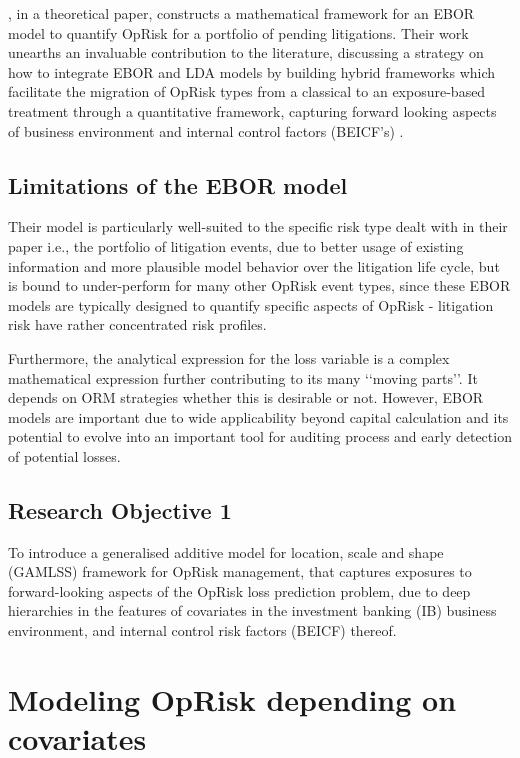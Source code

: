 \documentclass[a4paper]{article}
\begin{document}
\cite{einemann2018operational}, in a theoretical paper, constructs a mathematical framework for an EBOR model to quantify OpRisk for a portfolio of pending litigations. Their work unearths an invaluable contribution to the literature, discussing a strategy on how to integrate EBOR and LDA models by building hybrid frameworks which facilitate the migration of OpRisk types from a classical to an exposure-based treatment through a quantitative framework, capturing forward looking aspects of business environment and internal control factors (BEICF's) \citep{einemann2018operational}. 

\subsection{Limitations of the EBOR model}

Their model \citep{einemann2018operational} is particularly well-suited to the specific risk type dealt with in their paper i.e., the portfolio of litigation events, due to better usage of existing information and more plausible model behavior over the litigation life cycle, but is bound to under-perform for many other OpRisk event types, since these EBOR models are typically designed to quantify specific aspects of OpRisk -   litigation risk have rather concentrated risk profiles.\medskip

Furthermore, the analytical expression for the loss variable is a complex mathematical expression further contributing to its many \lq\lq moving parts\rq\rq. It depends on ORM strategies whether this is desirable or not. However, EBOR models are important due to wide applicability beyond capital calculation and its potential to evolve into an important tool for auditing process and early detection of potential losses. \quad 

\subsection{Research Objective 1}

To introduce a generalised additive model for location, scale and shape (GAMLSS) framework for OpRisk management, that captures exposures to forward-looking aspects of the OpRisk loss prediction problem, due to deep hierarchies in the features of covariates in the investment banking (IB) business environment, and internal control risk factors (BEICF) thereof.

\section{Modeling OpRisk depending on covariates}
\end{document}
